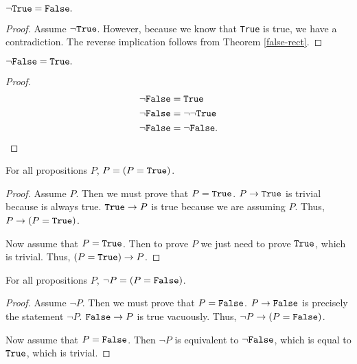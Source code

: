 \documentclass[../math.tex]{subfiles}
\begin{document}
\begin{theorem} \label{not-true}
    $\neg \verb|True| = \verb|False|.$
\end{theorem}
\begin{proof}
    Assume $\neg \verb|True|$.  However, because we know that \verb|True| is
    true, we have a contradiction.  The reverse implication follows from Theorem
    \ref{false-rect}.
\end{proof}

\begin{theorem} \label{not-false}
    $\neg \verb|False| = \verb|True|.$
\end{theorem}
\begin{proof}
    \begin{align*}
        \neg \vtt{False} &= \vtt{True} \\
        \neg \vtt{False} &= \neg \neg \vtt{True} \\
        \neg \vtt{False} &= \neg \vtt{False}.
    \end{align*}
\end{proof}

\begin{theorem} \label{prop-eq-true}
    For all propositions $P$, $P = (P = \vtt{True})$.
\end{theorem}
\begin{proof}
    Assume $P$.  Then we must prove that $P = \vtt{True}$.  $P \rightarrow
    \vtt{True}$ is trivial because  is always true.  $\vtt{True}
    \rightarrow P$ is true because we are assuming $P$.  Thus, $P \rightarrow (P
    = \vtt{True})$.

    Now assume that $P = \vtt{True}$.  Then to prove $P$ we just need to prove
    $\vtt{True}$, which is trivial.  Thus, $(P = \vtt{True}) \rightarrow P$.
\end{proof}

\begin{theorem} \label{prop-eq-false}
    For all propositions $P$, $\neg P = (P = \vtt{False})$.
\end{theorem}
\begin{proof}
    Assume $\neg P$.  Then we must prove that $P = \vtt{False}$.  $P \rightarrow
    \vtt{False}$ is precisely the statement $\neg P$.  $\vtt{False} \rightarrow
    P$ is true vacuously.  Thus, $\neg P \rightarrow (P = \vtt{False})$.

    Now assume that $P = \vtt{False}$.  Then $\neg P$ is equivalent to $\neg
    \vtt{False}$, which is equal to $\vtt{True}$, which is trivial.
\end{proof}
\end{document}
